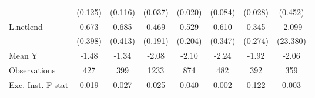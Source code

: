 {\begin{tabular}{l*{7}{c}}
            &     (0.125)         &     (0.116)         &     (0.037)         &     (0.020)         &     (0.084)         &     (0.028)         &     (0.452)         \\
\addlinespace
L.netlend   &       0.673\sym{*}  &       0.685\sym{*}  &       0.469\sym{**} &       0.529\sym{***}&       0.610\sym{*}  &       0.345         &      -2.099         \\
            &     (0.398)         &     (0.413)         &     (0.191)         &     (0.204)         &     (0.347)         &     (0.274)         &    (23.380)         \\
\midrule
Mean Y      &       -1.48         &       -1.34         &       -2.08         &       -2.10         &       -2.24         &       -1.92         &       -2.06         \\
Observations&         427         &         399         &        1233         &         874         &         482         &         392         &         359         \\
Exc. Inst. F-stat&       0.019         &       0.027         &       0.025         &       0.040         &       0.002         &       0.122         &       0.003         \\
\bottomrule
\end{tabular}
}
